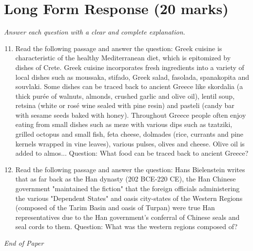 \documentclass[12pt]{article}
\begin{document}
\section*{Long Form Response (20 marks)}
\textit{Answer each question with a clear and complete explanation.}
\begin{enumerate}[label=\arabic*.]
\setcounter{enumi}{10}
\item Read the following passage and answer the question: Greek cuisine is characteristic of the healthy Mediterranean diet, which is epitomized by dishes of Crete. Greek cuisine incorporates fresh ingredients into a variety of local dishes such as moussaka, stifado, Greek salad, fasolada, spanakopita and souvlaki. Some dishes can be traced back to ancient Greece like skordalia (a thick purée of walnuts, almonds, crushed garlic and olive oil), lentil soup, retsina (white or rosé wine sealed with pine resin) and pasteli (candy bar with sesame seeds baked with honey). Throughout Greece people often enjoy eating from small dishes such as meze with various dips such as tzatziki, grilled octopus and small fish, feta cheese, dolmades (rice, currants and pine kernels wrapped in vine leaves), various pulses, olives and cheese. Olive oil is added to almos... Question: What food can be traced back to ancient Greece?
\item Read the following passage and answer the question: Hans Bielenstein writes that as far back as the Han dynasty (202 BCE-220 CE), the Han Chinese government "maintained the fiction" that the foreign officials administering the various "Dependent States" and oasis city-states of the Western Regions (composed of the Tarim Basin and oasis of Turpan) were true Han representatives due to the Han government's conferral of Chinese seals and seal cords to them. Question: What was the western regions composed of?
\end{enumerate}

\vfill
\noindent\textit{End of Paper}
\end{document}
